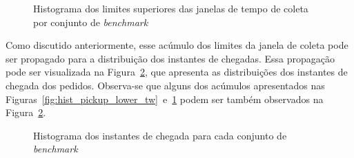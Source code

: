 \begin{figure}[h]
    \centering
    \caption{Histograma dos limites superiores das janelas de tempo de 
             coleta por conjunto de \textit{benchmark}}
    \label{fig:hist_pickup_upper_tw}
\end{figure}


Como discutido anteriormente, esse acúmulo dos limites da janela de coleta pode
ser propagado para a distribuição dos instantes de chegadas.
Essa propagação pode ser visualizada na Figura~\ref{fig:hist_arrival_time}, que
apresenta as distribuições dos instantes de chegada dos pedidos.
Observa-se que alguns dos acúmulos apresentados nas 
Figuras~\ref{fig:hist_pickup_lower_tw}~e~\ref{fig:hist_pickup_upper_tw} podem 
ser também observados na Figura~\ref{fig:hist_arrival_time}.


\begin{figure}[h]
    \centering
    \caption{Histograma dos instantes de chegada para cada conjunto 
             de \textit{benchmark}}
    \label{fig:hist_arrival_time}
\end{figure}

